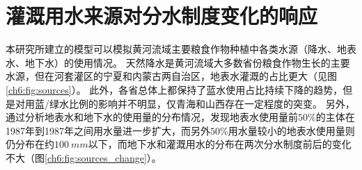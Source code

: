 



\section{灌溉用水来源对分水制度变化的响应}

本研究所建立的模型可以模拟黄河流域主要粮食作物种植中各类水源（降水、地表水、地下水）的使用情况。
天然降水是黄河流域大多数省份粮食作物生长的主要水源，但在河套灌区的宁夏和内蒙古两自治区，地表水灌溉的占比更大（见图\ref{ch6:fig:sources}）。
此外，各省总体上都保持了蓝水使用占比持续下降的趋势，但是对用蓝/绿水比例的影响并不明显，仅青海和山西存在一定程度的突变。
另外，通过分析地表水和地下水的使用量的分布情况，发现地表水使用量前$50\%$的主体在1987年到1987年之间用水量进一步扩大，而另外$50\%$用水量较小的地表水使用量则仍分布在约$100~mm$以下，而地下水和灌溉用水的分布在两次分水制度前后的变化不大（图\ref{ch6:fig:sources_change}）。


